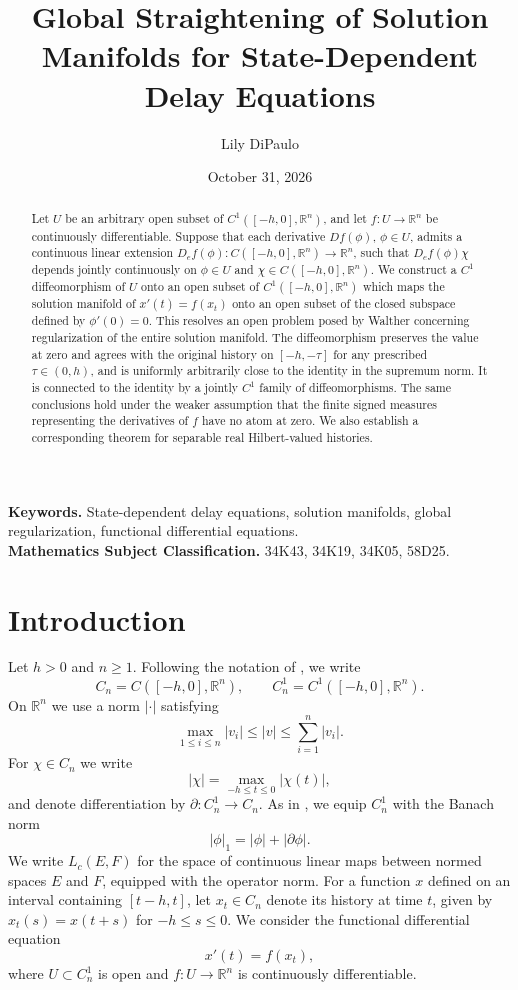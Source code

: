 \documentclass[11pt]{article}
\title{Global Straightening of Solution Manifolds for State-Dependent Delay Equations}
\author{Lily DiPaulo}
\date{October 31, 2026}
\newcommand{\Lc}{L_c}
\begin{document}
\maketitle


\begin{abstract}
Let $U$ be an arbitrary open subset of
$C^1([-h,0],\mathbb R^n)$, and let
$f:U\to\mathbb R^n$ be continuously differentiable.
Suppose that each derivative $Df(\phi)$, $\phi\in U$,
admits a continuous linear extension
$D_ef(\phi):C([-h,0],\mathbb R^n)\to\mathbb R^n$,
such that $D_ef(\phi)\chi$ depends jointly continuously
on $\phi\in U$ and
$\chi\in C([-h,0],\mathbb R^n)$. We construct a $C^1$ diffeomorphism
of $U$ onto an open subset of $C^1([-h,0],\mathbb R^n)$
which maps the solution manifold of $x'(t)=f(x_t)$ onto
an open subset of the closed subspace defined by
$\phi'(0)=0$. This resolves an open problem posed by
Walther concerning regularization of the entire solution
manifold. The diffeomorphism preserves the value at zero
and agrees with the original history on $[-h,-\tau]$ for any prescribed
$\tau\in(0,h)$, and is uniformly arbitrarily close to the
identity in the supremum norm. It is connected to the identity
by a jointly $C^1$ family of diffeomorphisms.
The same conclusions hold under the weaker assumption that
the finite signed measures representing the derivatives of
$f$ have no atom at zero. 
We also establish a corresponding theorem for separable
real Hilbert-valued histories.
\end{abstract}

\noindent\textbf{Keywords.} State-dependent delay equations, solution manifolds,
global regularization, functional differential equations.\\
\noindent\textbf{Mathematics Subject Classification.} 34K43, 34K19, 34K05, 58D25.


\section{Introduction}

Let $h>0$ and $n\ge1$. Following the notation of \cite{Walther2026}, we write
\[
C_n=C([-h,0],\mathbb R^n),\qquad
C_n^1=C^1([-h,0],\mathbb R^n).
\]
On $\mathbb R^n$ we use a norm $|\cdot|$ satisfying
\[
\max_{1\le i\le n}|v_i|\le |v|\le\sum_{i=1}^n|v_i|.
\]
For $\chi\in C_n$ we write
\[
 |\chi|=\max_{-h\le t\le0}|\chi(t)|,
\]
and denote differentiation by $\partial:C_n^1\to C_n$.
As in \cite{Walther2026}, we equip $C_n^1$ with the Banach norm
\[
 |\phi|_1=|\phi|+|\partial\phi|.
\]
We write $\Lc(E,F)$ for the space of continuous linear
maps between normed spaces $E$ and $F$, equipped with
the operator norm.
For a function $x$ defined on an interval
containing $[t-h,t]$, let $x_t\in C_n$ denote its history
at time $t$, given by $x_t(s)=x(t+s)$ for $-h\le s\le0$.
We consider the functional differential equation
\begin{equation}\label{eq:dde}
x'(t)=f(x_t),
\end{equation}
where $U\subset C_n^1$ is open and
$f:U\to\mathbb R^n$ is continuously differentiable.
\end{document}
